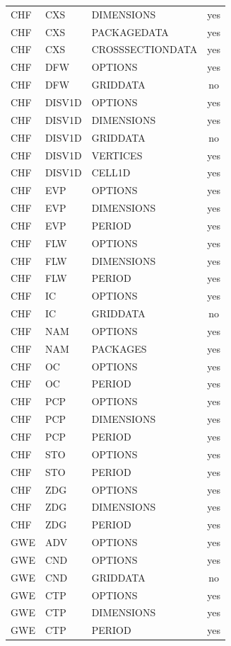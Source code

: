 \begin{longtable}{p{1.5cm} p{1.5cm} p{3cm} c}
CHF & CXS & DIMENSIONS & yes \\ 
CHF & CXS & PACKAGEDATA & yes \\ 
CHF & CXS & CROSSSECTIONDATA & yes \\ 
\hline
CHF & DFW & OPTIONS & yes \\ 
CHF & DFW & GRIDDATA & no \\ 
\hline
CHF & DISV1D & OPTIONS & yes \\ 
CHF & DISV1D & DIMENSIONS & yes \\ 
CHF & DISV1D & GRIDDATA & no \\ 
CHF & DISV1D & VERTICES & yes \\ 
CHF & DISV1D & CELL1D & yes \\ 
\hline
CHF & EVP & OPTIONS & yes \\ 
CHF & EVP & DIMENSIONS & yes \\ 
CHF & EVP & PERIOD & yes \\ 
\hline
CHF & FLW & OPTIONS & yes \\ 
CHF & FLW & DIMENSIONS & yes \\ 
CHF & FLW & PERIOD & yes \\ 
\hline
CHF & IC & OPTIONS & yes \\ 
CHF & IC & GRIDDATA & no \\ 
\hline
CHF & NAM & OPTIONS & yes \\ 
CHF & NAM & PACKAGES & yes \\ 
\hline
CHF & OC & OPTIONS & yes \\ 
CHF & OC & PERIOD & yes \\ 
\hline
CHF & PCP & OPTIONS & yes \\ 
CHF & PCP & DIMENSIONS & yes \\ 
CHF & PCP & PERIOD & yes \\ 
\hline
CHF & STO & OPTIONS & yes \\ 
CHF & STO & PERIOD & yes \\ 
\hline
CHF & ZDG & OPTIONS & yes \\ 
CHF & ZDG & DIMENSIONS & yes \\ 
CHF & ZDG & PERIOD & yes \\ 
\hline
GWE & ADV & OPTIONS & yes \\ 
\hline
GWE & CND & OPTIONS & yes \\ 
GWE & CND & GRIDDATA & no \\ 
\hline
GWE & CTP & OPTIONS & yes \\ 
GWE & CTP & DIMENSIONS & yes \\ 
GWE & CTP & PERIOD & yes \\ 

\end{longtable}
